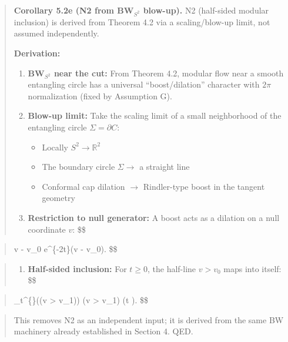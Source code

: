 \documentclass[11pt,a4paper]{article}
\theoremstyle{remark}
\providecommand{\tightlist}{%
  \setlength{\itemsep}{0pt}\setlength{\parskip}{0pt}}
\begin{document}
\begin{quote}
\textbf{Corollary 5.2e (N2 from BW\(_{S^2}\) blow-up).} N2 (half-sided modular
inclusion) is derived from Theorem 4.2 via a scaling/blow-up limit, not
assumed independently.

\textbf{Derivation:}

\begin{enumerate}
\def\labelenumi{\arabic{enumi}.}
\item
  \textbf{BW\(_{S^2}\) near the cut:} From Theorem 4.2, modular flow near a smooth
  entangling circle has a universal ``boost/dilation'' character with \(2\pi\)
  normalization (fixed by Assumption G).
\item
  \textbf{Blow-up limit:} Take the scaling limit of a small neighborhood of the
  entangling circle \(\Sigma = \partial C\):

  \begin{itemize}
  \tightlist
  \item
    Locally \(S^2 \to \mathbb{R}^2\)
  \item
    The boundary circle \(\Sigma \to\) a straight line
  \item
    Conformal cap dilation \(\to\) Rindler-type boost in the tangent geometry
  \end{itemize}
\item
  \textbf{Restriction to null generator:} A boost acts as a dilation on a null
  coordinate \(v\):
  \$\$
\end{enumerate}
\end{quote}

\begin{quote}
v - v\_0 \mapsto e\^{}\{-2\pi t\}(v - v\_0).
\$\$
\end{quote}

\begin{quote}
\begin{enumerate}
\def\labelenumi{\arabic{enumi}.}
\setcounter{enumi}{3}
\tightlist
\item
  \textbf{Half-sided inclusion:} For \(t \ge 0\), the half-line \(v > v_0\) maps into
  itself:
  \$\$
\end{enumerate}
\end{quote}

\begin{quote}
\sigma\_t\^{}\{\omega\}((v \textgreater{} v\_1)) \subseteq {}(v \textgreater{} v\_1)
\quad (t ).
\$\$
\end{quote}

\begin{quote}
This removes N2 as an independent input; it is derived from the same BW
machinery already established in Section 4. QED.
\end{quote}
\end{document}

